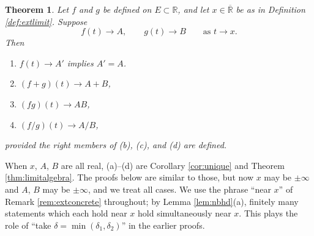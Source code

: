 \documentclass{article}
\theoremstyle{mythm}
\newtheorem{theorem}{Theorem}[section]
\begin{document}
\begin{theorem}\label{thm:extalgebra}
Let $f$ and $g$ be defined on $E \subset \mathbb{R}$, and let $x \in \overline{\mathbb{R}}$ be as in Definition \ref{def:extlimit}. Suppose
\[
f(t) \to A, \qquad g(t) \to B \qquad \text{as } t \to x.
\]
Then
\begin{enumerate}[label=(\alph*)]
    \item $f(t) \to A'$ implies $A' = A$.
    \item $(f + g)(t) \to A + B$,
    \item $(fg)(t) \to AB$,
    \item $(f/g)(t) \to A/B$,
\end{enumerate}
provided the right members of (b), (c), and (d) are defined.
\end{theorem}

When $x$, $A$, $B$ are all real, (a)--(d) are Corollary \ref{cor:unique} and Theorem \ref{thm:limitalgebra}. The proofs below are similar to those, but now $x$ may be $\pm\infty$ and $A$, $B$ may be $\pm\infty$, and we treat all cases. We use the phrase ``near $x$'' of Remark \ref{rem:extconcrete} throughout; by Lemma \ref{lem:nbhd}(a), finitely many statements which each hold near $x$ hold simultaneously near $x$. This plays the role of ``take $\delta = \min(\delta_1, \delta_2)$'' in the earlier proofs.
\end{document}
